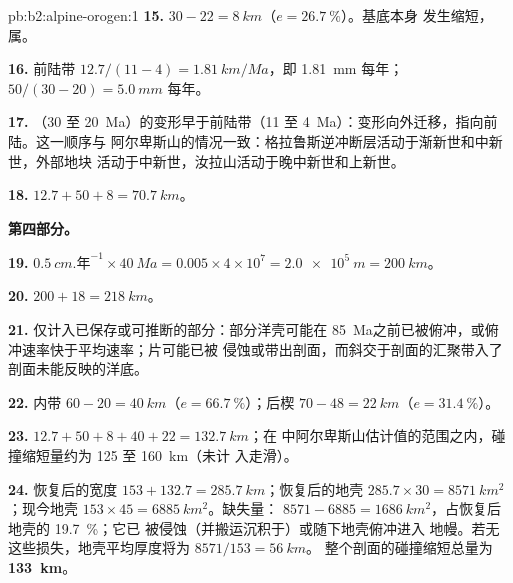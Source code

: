 \begin{solution}{pb:b2:alpine-orogen:1}
\textbf{15.} $30 - 22 = \qty{8}{km}$（$e = \qty{26.7}{\percent}$）。基底本身
发生缩短，属。

\textbf{16.} 前陆带 $12.7/(11 - 4) = \qty{1.81}{km/Ma}$，即
\qty{1.81}{mm} 每年； $50/(30 - 20) = \qty{5.0}{mm}$ 每年。

\textbf{17.} （30 至 \qty{20}{Ma}）的变形早于前陆带（11 至
\qty{4}{Ma}）：变形向外迁移，指向前陆。这一顺序与
阿尔卑斯山的情况一致：格拉鲁斯逆冲断层活动于渐新世和中新世，外部地块
活动于中新世，汝拉山活动于晚中新世和上新世。

\textbf{18.} $12.7 + 50 + 8 = \qty{70.7}{km}$。

\noindent\textbf{第四部分。}

\textbf{19.} $\qty{0.5}{cm.\text{年}^{-1}}\times\qty{40}{Ma} = 0.005\times4\times10^7 =
\qty{2.0e5}{m} = \qty{200}{km}$。

\textbf{20.} $200 + 18 = \qty{218}{km}$。

\textbf{21.} 仅计入已保存或可推断的部分：部分洋壳可能在
\qty{85}{Ma}之前已被俯冲，或俯冲速率快于平均速率；片可能已被
侵蚀或带出剖面，而斜交于剖面的汇聚带入了
剖面未能反映的洋底。

\textbf{22.} 内带 $60 - 20 = \qty{40}{km}$（$e = \qty{66.7}{\percent}$）；后楔
$70 - 48 = \qty{22}{km}$（$e = \qty{31.4}{\percent}$）。

\textbf{23.} $12.7 + 50 + 8 + 40 + 22 = \qty{132.7}{km}$；在
中阿尔卑斯山估计值的范围之内，碰撞缩短量约为 125 至 \qty{160}{km}（未计
入走滑）。

\textbf{24.} 恢复后的宽度 $153 + 132.7 = \qty{285.7}{km}$；恢复后的地壳
$285.7\times30 = \qty{8571}{km^2}$；现今地壳 $153\times45 = \qty{6885}{km^2}$。缺失量：
$8571 - 6885 = \qty{1686}{km^2}$，占恢复后地壳的 \qty{19.7}{\percent}；它已
被侵蚀（并搬运沉积于）或随下地壳俯冲进入
地幔。若无这些损失，地壳平均厚度将为 $8571/153 = \qty{56}{km}$。
整个剖面的碰撞缩短总量为
\textbf{\qty[text-series-to-math=true]{133}{km}}。
\end{solution}
